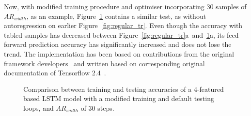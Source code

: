%
%
Now, with modified training procedure and optimiser incorporating 30 samples of $AR_{width}$, as an example, \mbox{Figure~\ref{fig:modefied_tr}} contains a similar test, as without autoregression on earlier Figure~\ref{fig:regular_tr}.
Even though the accuracy with tabled samples has decreased between \mbox{Figure~\ref{fig:regular_tr}a and~\ref{fig:modefied_tr}a}, its feed-forward prediction accuracy has significantly increased and does not lose the trend.
The implementation has been based on contributions from the original framework developers~\cite{time_2020} and written based on corresponding original documentation of Tensorflow 2.4~\cite{tensorflow2015-whitepaper}.
 {
\begin{figure}[!t]
    \centering
    \vspace{-3ex}
    \label{subfig:modefied_tr}
    \label{subfig:modefied_ts}
    \caption{Comparison between training and testing accuracies of a 4-featured based LSTM model with a modified training and default testing loops, and $AR_{width}$ of 30 steps.}
    \label{fig:modefied_tr}
\end{figure}
}
